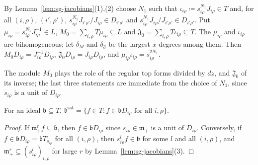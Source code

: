 \begin{definition}\label{def:sg-forms}
\leanok
{}
By Lemma~\ref{lem:sg-jacobians}(1),(2) choose $N_1$ such that $\iota_{i\rho}\coloneqq s_{i\rho}^{N_1}J_{i\rho}\in T$ and, for all $(i,\rho)$, $(i',\rho')$,
$s_{i\rho}^{N_1}J_{i'\rho'}/J_{i\rho}\in D_{i'\rho'}$ and $s_{i\rho}^{N_1}J_{i\rho}/J_{i'\rho'}\in D_{i'\rho'}$. Put $\mu_{i\rho}=s_{i\rho}^{N_1}J_{i\rho}^{-1}\in L$,
$M_0=\sum_{i,\rho}T\mu_{i\rho}\subseteq L$ and $\mathfrak J_0=\sum_{i,\rho}T\iota_{i\rho}\subseteq T$. The $\mu_{i\rho}$ and $\iota_{i\rho}$ are bihomogeneous; let
$\delta_M$ and $\delta_{\mathfrak J}$ be the largest $x$-degrees among them. Then $M_0D_{i\rho}=J_{i\rho}^{-1}D_{i\rho}$, $\mathfrak J_0D_{i\rho}=J_{i\rho}D_{i\rho}$, and
$\mu_{i\rho}\iota_{i\rho}=s_{i\rho}^{2N_1}$.
\end{definition}

The module $M_0$ plays the role of the regular top forms divided by $dz$, and $\mathfrak J_0$ of its inverse; the last three statements are
immediate from the choice of $N_1$, since $s_{i\rho}$ is a unit of $D_{i\rho}$.

\begin{lemma}\label{lem:sg-sat}
\leanok
{}
For an ideal $\mathfrak b\subseteq T$, $\mathfrak b^{\mathrm{sat}}=\{f\in T:f\in\mathfrak bD_{i\rho}\text{ for all }i,\rho\}$.
\end{lemma}

\begin{proof}
If $\mathfrak m_+^rf\subseteq\mathfrak b$, then $f\in\mathfrak bD_{i\rho}$ since $s_{i\rho}\in\mathfrak m_+$ is a unit of $D_{i\rho}$. Conversely, if $f\in\mathfrak bD_{i\rho}=\mathfrak bT_{s_{i\rho}}$ for
all $(i,\rho)$, then $s_{i\rho}^lf\in\mathfrak b$ for some $l$ and all $(i,\rho)$, and $\mathfrak m_+^{r}\subseteq(s_{i\rho}^l)_{i,\rho}$ for large $r$ by
Lemma~\ref{lem:sg-jacobians}(3).
\end{proof}

